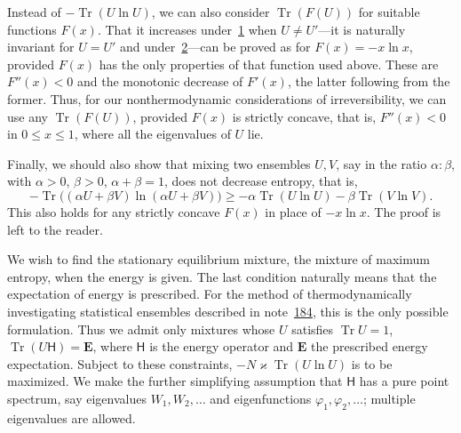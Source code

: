 \documentclass[fontsize=13pt,twoside,openany,headings=normal,parskip=false,bookmarkpackage=false,DIV=calc]{scrbook}
\begin{document}
Instead of $-\operatorname{Tr}(U\ln U)$, we can also consider $\operatorname{Tr}(F(U))$ for suitable functions $F(x)$. That it increases under~\hyperref[eq:V.1.1]{1} when $U\ne U'$---it is naturally invariant for $U=U'$ and under~\hyperref[eq:V.1.2]{2}---can be proved as for $F(x)=-x\ln x$, provided $F(x)$ has the only properties of that function used above. These are $F''(x)<0$ and the monotonic decrease of $F'(x)$, the latter following from the former. Thus, for our nonthermodynamic considerations of irreversibility, we can use any $\operatorname{Tr}(F(U))$, provided $F(x)$ is strictly concave, that is, $F''(x)<0$ in $0\leq x\leq1$, where all the eigenvalues of $U$ lie.

Finally, we should also show that mixing two ensembles $U,V$, say in the ratio $\alpha:\beta$, with $\alpha>0$, $\beta>0$, $\alpha+\beta=1$, does not decrease entropy, that is,
\[
-\operatorname{Tr}\bigl((\alpha U+\beta V)\ln(\alpha U+\beta V)\bigr)
\geq-\alpha\operatorname{Tr}(U\ln U)-\beta\operatorname{Tr}(V\ln V).
\]
This also holds for any strictly concave $F(x)$ in place of $-x\ln x$. The proof is left to the reader.

We wish to find the stationary equilibrium mixture, the mixture of maximum entropy, when the energy is given. The last condition naturally means that the expectation of energy
\hypertarget{origpage-208}{}%
is prescribed. For the method of thermodynamically investigating statistical ensembles described in note~\hyperlink{note-184}{184}, this is the only possible formulation. Thus we admit only mixtures whose $U$ satisfies $\operatorname{Tr}U=1$, $\operatorname{Tr}(U\mathsf{H})=\mathbf E$, where $\mathsf{H}$ is the energy operator and $\mathbf E$ the prescribed energy expectation. Subject to these constraints, $-N\varkappa\operatorname{Tr}(U\ln U)$ is to be maximized. We make the further simplifying assumption that $\mathsf{H}$ has a pure point spectrum, say eigenvalues $W_1,W_2,\ldots$ and eigenfunctions $\varphi_1,\varphi_2,\ldots$; multiple eigenvalues are allowed.
\end{document}
